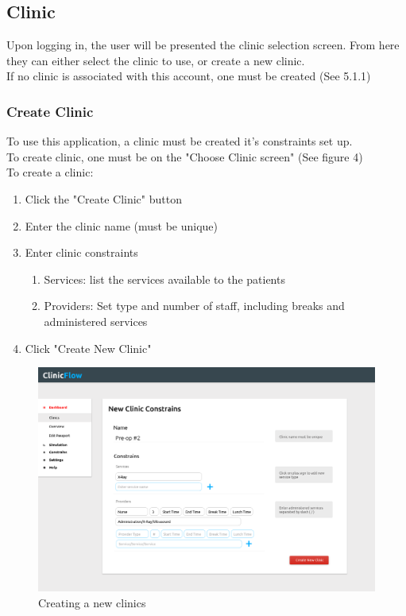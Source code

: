 \documentclass[12pt]{article}
\begin{document}
\subsection{Clinic}
Upon logging in, the user will be presented the clinic selection screen. From here they can either select the clinic to use, or create a new clinic.\\

If no clinic is associated with this account, one must be created (See 5.1.1)\\

\subsubsection{Create Clinic}
To use this application, a clinic must be created it's constraints set up.\\
To create clinic, one must be on the "Choose Clinic screen" (See figure 4)\\

To create a clinic:
\begin{enumerate}
\item Click the "Create Clinic" button
\item Enter the clinic name (must be unique)
\item Enter clinic constraints
\begin{enumerate}
	\item Services: list the services available to the patients
	\item Providers: Set type and number of staff, including breaks and administered services
\end{enumerate}
\item Click "Create New Clinic"
\end{enumerate}
\begin{figure}[H]
\centering
\includegraphics[width=\textwidth]{newclinic}
\caption{Creating a new clinics}
\end{figure}
\end{document}
